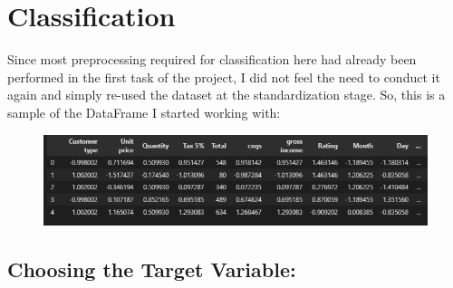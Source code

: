 
\chapter{Classification} %

\label{Chapter9} %

Since most preprocessing required for classification here had already been performed in the first task of the project, I did not feel the need to conduct it again and simply re-used the dataset at the standardization stage. So, this is a sample of the DataFrame I started working with:

\begin{figure}[h]
    \centering
    \includegraphics[width=1\textwidth]{Chapters/ch9/data_1.png}
\end{figure}



\section{Choosing the Target Variable:}

